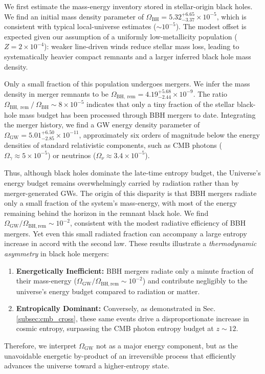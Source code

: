 \documentclass[twocolumn]{aastex631}
\begin{document}
We first estimate the mass-energy inventory stored in stellar-origin black holes. We find an initial mass density parameter of $\Omega_\mathrm{BH} = 5.32^{+6.65}_{-3.37}\times 10^{-5}$, which is consistent with typical local-universe estimates ($\sim 10^{-5}$). The modest offset is expected given our assumption of a uniformly low-metallicity population ($Z=2\times 10^{-4}$): weaker line-driven winds reduce stellar mass loss, leading to systematically heavier compact remnants and a larger inferred black hole mass density.

Only a small fraction of this population undergoes mergers. We infer the mass density in merger remnants to be $\Omega_\mathrm{BH,~rem} = 4.19^{+5.68}_{-2.44} \times 10^{-9}$. The ratio $\Omega_\mathrm{BH,~rem}~/~\Omega_\mathrm{BH} \sim 8 \times 10^{-5}$ indicates that only a tiny fraction of the stellar black-hole mass budget has been processed through BBH mergers to date. Integrating the merger history, we find a GW energy density parameter of $\Omega_\mathrm{GW} = 5.01^{+6.50}_{-2.85}\times 10^{-11}$, approximately six orders of magnitude below the energy densities of standard relativistic components, such as CMB photons ($\Omega_{\gamma} \approx 5 \times 10^{-5}$) or neutrinos ($\Omega_{\nu} \approx 3.4 \times 10^{-5}$).

Thus, although black holes dominate the late-time entropy budget, the Universe’s energy budget remains overwhelmingly carried by radiation rather than by merger-generated GWs. The origin of this disparity is that BBH mergers radiate only a small fraction of the system’s mass-energy, with most of the energy remaining behind the horizon in the remnant black hole. We find $\Omega_\mathrm{GW}/\Omega_\mathrm{BH,rem} \sim 10^{-2}$, consistent with the modest radiative efficiency of BBH mergers. Yet even this small radiated fraction can accompany a large entropy increase in accord with the second law. These results illustrate a \textit{thermodynamic asymmetry} in black hole mergers:
\begin{enumerate}
    \item \textbf{Energetically Inefficient:} BBH mergers radiate only a minute fraction of their mass-energy ($\Omega_\mathrm{GW}/\Omega_\mathrm{BH,rem} \sim 10^{-2}$) and contribute negligibly to the universe's energy budget compared to radiation or matter.
    \item \textbf{Entropically Dominant:} Conversely, as demonstrated in Sec. \ref{subsec:cmb_cross}, these same events drive a disproportionate increase in cosmic entropy, surpassing the CMB photon entropy budget at $z \sim 12$.
\end{enumerate}
Therefore, we interpret $\Omega_\mathrm{GW}$ not as a major energy component, but as the unavoidable energetic by-product of an irreversible process that efficiently advances the universe toward a higher-entropy state.
\end{document}
